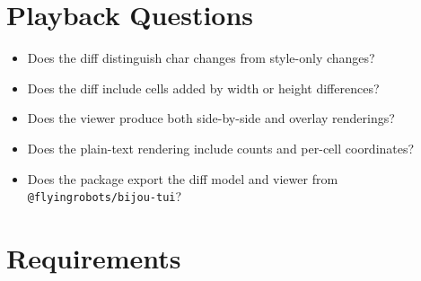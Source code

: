 \section{Playback Questions}\label{record-124-playback-questions}

\begin{itemize}
\tightlist
\item
  Does the diff distinguish char changes from style-only changes?
\item
  Does the diff include cells added by width or height differences?
\item
  Does the viewer produce both side-by-side and overlay renderings?
\item
  Does the plain-text rendering include counts and per-cell coordinates?
\item
  Does the package export the diff model and viewer from \texttt{@\allowbreak{}f\allowbreak{}l\allowbreak{}y\allowbreak{}i\allowbreak{}n\allowbreak{}g\allowbreak{}r\allowbreak{}o\allowbreak{}b\allowbreak{}o\allowbreak{}t\allowbreak{}s\allowbreak{}/\allowbreak{}b\allowbreak{}i\allowbreak{}j\allowbreak{}o\allowbreak{}u\allowbreak{}-\allowbreak{}t\allowbreak{}u\allowbreak{}i}?
\end{itemize}

\section{Requirements}\label{record-124-requirements}

